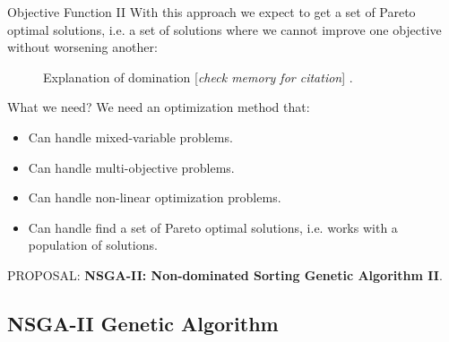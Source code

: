 \begin{frame}{Objective Function II}
With this approach we expect to get a set of Pareto optimal solutions, i.e. a set of solutions where we cannot improve one objective without worsening another:

\begin{figure}
    \centering
    \caption{Explanation of domination [\textit{check memory for citation}] .}
    \label{fig:domination}
\end{figure}

\end{frame}



\begin{frame}{What we need?}
We need an optimization method that:
\begin{itemize}
    \item Can handle mixed-variable problems.
    \item Can handle multi-objective problems.
    \item Can handle non-linear optimization problems.
    \item Can handle find a set of Pareto optimal solutions, i.e. works with a population of solutions.
\end{itemize}
\vspace{1cm}
PROPOSAL: \textbf{NSGA-II: Non-dominated Sorting Genetic Algorithm II}.
\end{frame}


\subsection{NSGA-II Genetic Algorithm}

